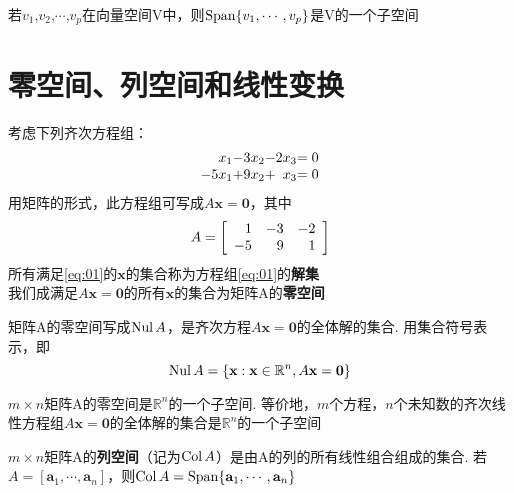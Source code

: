 \begin{theorem}
若$v_1$,$v_2$,$\cdots$,$v_p$在向量空间V中，则$\operatorname{Span}\{v_1,\cdots,v_p\}$是V的一个子空间
\end{theorem}

\section{零空间、列空间和线性变换}
考虑下列齐次方程组：
\begin{equation}
\begin{array}{r@{\hspace{0pt}}l@{\hspace{0pt}}r@{\hspace{0pt}}l@{\hspace{0pt}}r@{\hspace{0pt}}l}
x_1 & - & 3x_2 & - & 2x_3 & =0\\
-5x_1 & + & 9x_2 & + & x_3 & =0
\end{array}\label{eq:01}
\end{equation}
用矩阵的形式，此方程组可写成$A\mathbf{x=0}$，其中
\[A=\left[\begin{array}{r r r}
1 & -3 & -2\\
-5 & 9 & 1
\end{array}\right]\]
所有满足\eqref{eq:01}的$\mathbf{x}$的集合称为方程组\eqref{eq:01}的\textbf{解集}\\
我们成满足$A\mathbf{x=0}$的所有$\mathbf{x}$的集合为矩阵A的\textbf{零空间}\\[2ex]

\begin{definition}
矩阵A的零空间写成$\operatorname{Nul} A$，是齐次方程$A\mathbf{x=0}$的全体解的集合. 用集合符号表示，即
\[\operatorname{Nul} A=\{\mathbf{x}:\mathbf{x}\in\mathbb{R}^n, A\mathbf{x=0}\}\]
\end{definition}\vspace{4ex}

\begin{theorem}
$m\times n$矩阵A的零空间是$\mathbb{R}^n$的一个子空间. 等价地，$m$个方程，$n$个未知数的齐次线性方程组$A\mathbf{x=0}$的全体解的集合是$\mathbb{R}^n$的一个子空间
\end{theorem}\vspace{4ex}

\begin{definition}
$m\times n$矩阵A的\textbf{列空间}（记为$\operatorname{Col} A$）是由A的列的所有线性组合组成的集合. 若$A=[\mathbf{a}_1,\cdots,\mathbf{a}_n]$，则$\operatorname{Col} A=\operatorname{Span}\{\mathbf{a}_1,\cdots,\mathbf{a}_n\}$
\end{definition}\vspace{4ex}


